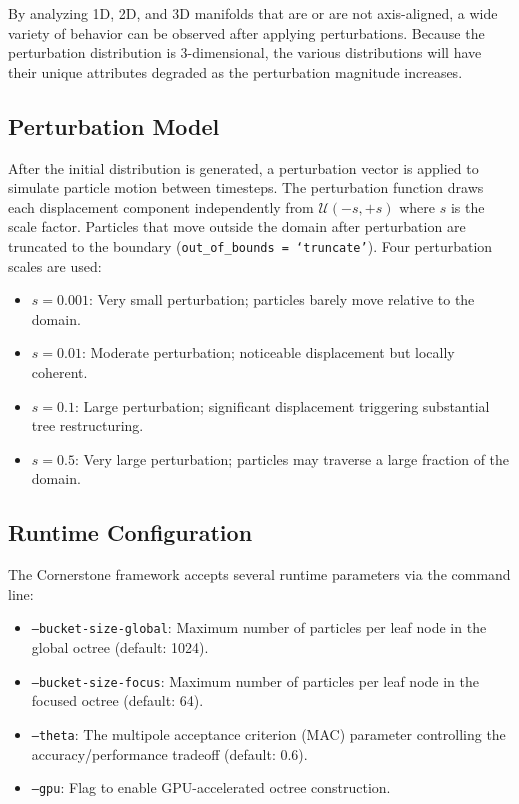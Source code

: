 By analyzing 1D, 2D, and 3D manifolds that are or are not axis-aligned, a wide variety of behavior can be observed after applying perturbations. Because the perturbation distribution is 3-dimensional, the various distributions will have their unique attributes degraded as the perturbation magnitude increases.  

\subsection{Perturbation Model}

After the initial distribution is generated, a perturbation vector is applied to simulate particle motion between timesteps. The perturbation function draws each displacement component independently from $\mathcal{U}(-s, +s)$ where $s$ is the scale factor. Particles that move outside the domain after perturbation are truncated to the boundary (\texttt{out\_of\_bounds = `truncate'}). Four perturbation scales are used:

\begin{itemize}
    \item $s = 0.001$: Very small perturbation; particles barely move relative to the domain.
    \item $s = 0.01$\phantom{0}: Moderate perturbation; noticeable displacement but locally coherent.
    \item $s = 0.1$\phantom{00}: Large perturbation; significant displacement triggering substantial tree restructuring.
    \item $s = 0.5$\phantom{00}: Very large perturbation; particles may traverse a large fraction of the domain.
\end{itemize}

\subsection{Runtime Configuration}

The Cornerstone framework accepts several runtime parameters via the command line:

\begin{itemize}
    \item \texttt{--bucket-size-global}: Maximum number of particles per leaf node in the global octree (default: 1024).
    \item \texttt{--bucket-size-focus}: Maximum number of particles per leaf node in the focused octree (default: 64).
    \item \texttt{--theta}: The multipole acceptance criterion (MAC) parameter controlling the accuracy/performance tradeoff (default: 0.6).
    \item \texttt{--gpu}: Flag to enable GPU-accelerated octree construction.
\end{itemize}

